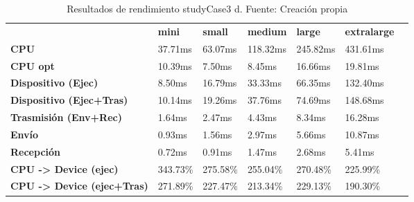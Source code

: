 \begin{table}[H]
    \centering
    \begin{tabular}{lllllll}
    \rowcolor[HTML]{DAE8FC} \ &  \textbf{mini} &  \textbf{small} &  \textbf{medium} &  \textbf{	large} &  \textbf{	extralarge} \\
    \cellcolor[HTML]{DAE8FC} \textbf{CPU} & 37.71ms & 63.07ms & 118.32ms & 	245.82ms & 	431.61ms \\
    \rowcolor[HTML]{EFEFEF} \cellcolor[HTML]{DAE8FC} \textbf{CPU opt} & 10.39ms & 7.50ms & 8.45ms & 	16.66ms & 	19.81ms \\
    \cellcolor[HTML]{DAE8FC} \textbf{Dispositivo (Ejec)} & 8.50ms & 16.79ms & 33.33ms & 	66.35ms & 	132.40ms \\
    \rowcolor[HTML]{EFEFEF} \cellcolor[HTML]{DAE8FC} \textbf{Dispositivo (Ejec+Tras)} & 10.14ms & 19.26ms & 37.76ms & 	74.69ms & 	148.68ms \\
    \cellcolor[HTML]{DAE8FC} \textbf{Trasmisión (Env+Rec)} & 1.64ms & 2.47ms & 4.43ms & 	8.34ms & 	16.28ms \\
    \rowcolor[HTML]{EFEFEF} \cellcolor[HTML]{DAE8FC} \textbf{Envío} & 0.93ms & 1.56ms & 2.97ms & 	5.66ms & 	10.87ms \\
    \cellcolor[HTML]{DAE8FC} \textbf{Recepción} & 0.72ms & 0.91ms & 1.47ms & 	2.68ms & 	5.41ms \\
    \rowcolor[HTML]{EFEFEF} \cellcolor[HTML]{DAE8FC} \textbf{CPU -> Device (ejec)} & 343.73\% & 275.58\% & 255.04\% & 	270.48\% & 	225.99\% \\
    \cellcolor[HTML]{DAE8FC} \textbf{CPU -> Device (ejec+Tras)} & 271.89\% & 227.47\% & 213.34\% & 	229.13\% & 	190.30\% \\
    \end{tabular}
    \caption[Resultados de rendimiento studyCase3 d]{{Resultados de rendimiento studyCase3 d. Fuente: Creación propia}}
    \label{table_test_studyCase3_d_hw_performanceResults}
\end{table}